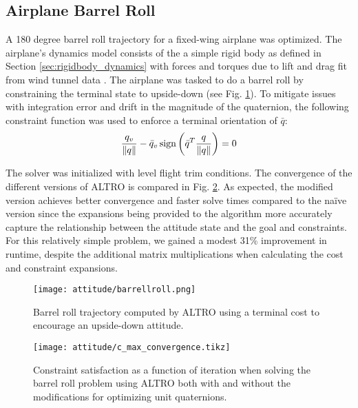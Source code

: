 \documentclass[../root.tex]{subfiles}
\begin{document}
    \subsection{Airplane Barrel Roll}

        A 180 degree barrel roll trajectory for a fixed-wing airplane was
        optimized. The airplane's dynamics model consists of the a simple
        rigid body as defined in Section \ref{sec:rigidbody_dynamics} with
        forces and torques due to lift and drag fit from wind tunnel data 
        \cite{manchester_Derivativefree_2016}. 
        The airplane was tasked to do a barrel roll
        by constraining the terminal state to upside-down (see Fig.
        \ref{fig:barrellroll}). To mitigate issues with integration error and
        drift in the magnitude of the quaternion, the following constraint
        function was used to enforce a terminal orientation of $\bar{q}$:
        \begin{equation}
            \frac{q_v}{\norm{q}} - \bar{q}_v
                \operatorname{sign}\left(\bar{q}^T \frac{q }{ \norm{q}}\right) = 0
        \end{equation}

        The solver was initialized with level flight trim
        conditions. The convergence of the different versions of ALTRO is compared in
        Fig. \ref{fig:c_max_convergence}. As expected, the modified version achieves
        better convergence and faster solve times compared to the na\"ive version since
        the expansions being provided to the algorithm more accurately capture the
        relationship between the attitude state and the goal and constraints. For this 
        relatively simple problem, we gained a modest 31\% improvement in runtime, despite
        the additional matrix multiplications when calculating the cost and constraint
        expansions.

        \begin{figure}[t]
            \centering
            \texttt{[image: attitude/barrellroll.png]}
            \caption{Barrel roll trajectory computed by ALTRO using a terminal cost to encourage an upside-down attitude.}
            \label{fig:barrellroll}
        \end{figure}

        \begin{figure}[t]
            \centering
            \texttt{[image: attitude/c\_max\_convergence.tikz]}
            \caption{Constraint satisfaction as a function of iteration when solving the barrel roll problem using ALTRO both with and without the modifications for optimizing unit quaternions.}
            \label{fig:c_max_convergence}
        \end{figure}
\end{document}
